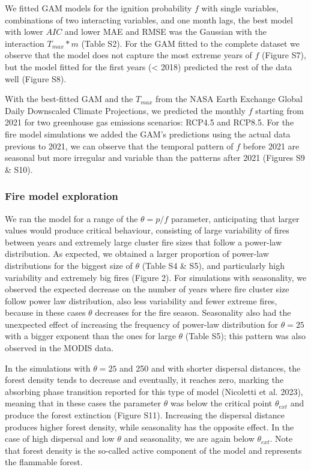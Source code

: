 \documentclass[
]{article}
\begin{document}
We fitted GAM models for the ignition probability \(f\) with single
variables, combinations of two interacting variables, and one month
lags, the best model with lower \(AIC\) and lower MAE and RMSE was the
Gaussian with the interaction \(T_{max} * m\) (Table S2). For the GAM
fitted to the complete dataset we observe that the model does not
capture the most extreme years of \(f\) (Figure S7), but the model
fitted for the first years (\textless{} 2018) predicted the rest of the
data well (Figure S8).

With the best-fitted GAM and the \(T_{max}\) from the NASA Earth
Exchange Global Daily Downscaled Climate Projections, we predicted the
monthly \(f\) starting from 2021 for two greenhouse gas emissions
scenarios: RCP4.5 and RCP8.5. For the fire model simulations we added
the GAM's predictions using the actual data previous to 2021, we can
observe that the temporal pattern of \(f\) before 2021 are seasonal but
more irregular and variable than the patterns after 2021 (Figures S9 \&
S10).

\subsubsection{Fire model exploration}\label{fire-model-exploration}

We ran the model for a range of the \(\theta = p/f\) parameter,
anticipating that larger values would produce critical behaviour,
consisting of large variability of fires between years and extremely
large cluster fire sizes that follow a power-law distribution. As
expected, we obtained a larger proportion of power-law distributions for
the biggest size of \(\theta\) (Table S4 \& S5), and particularly high
variability and extremely big fires (Figure 2). For simulations with
seasonality, we observed the expected decrease on the number of years
where fire cluster size follow power law distribution, also less
variability and fewer extreme fires, because in these cases \(\theta\)
decreases for the fire season. Seasonality also had the unexpected
effect of increasing the frequency of power-law distribution for
\(\theta = 25\) with a bigger exponent than the ones for large
\(\theta\) (Table S5); this pattern was also observed in the MODIS data.

In the simulations with \(\theta = 25\) and 250 and with shorter
dispersal distances, the forest density tends to decrease and
eventually, it reaches zero, marking the absorbing phase transition
reported for this type of model (Nicoletti et al. 2023), meaning that in
these cases the parameter \(\theta\) was below the critical point
\(\theta_{ext}\) and produce the forest extinction (Figure S11).
Increasing the dispersal distance produces higher forest density, while
seasonality has the opposite effect. In the case of high dispersal and
low \(\theta\) and seasonality, we are again below \(\theta_{ext}\).
Note that forest density is the so-called active component of the model
and represents the flammable forest.
\end{document}

